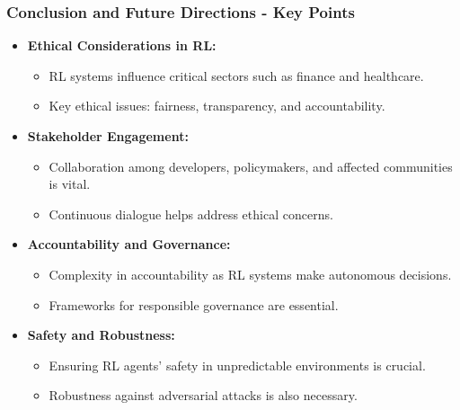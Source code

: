 \documentclass[aspectratio=169]{beamer}
\begin{document}
\begin{frame}[fragile]
    \frametitle{Conclusion and Future Directions - Key Points}
    \begin{itemize}
        \item \textbf{Ethical Considerations in RL:}
            \begin{itemize}
                \item RL systems influence critical sectors such as finance and healthcare.
                \item Key ethical issues: fairness, transparency, and accountability.
            \end{itemize}
        \item \textbf{Stakeholder Engagement:}
            \begin{itemize}
                \item Collaboration among developers, policymakers, and affected communities is vital.
                \item Continuous dialogue helps address ethical concerns.
            \end{itemize}
        \item \textbf{Accountability and Governance:}
            \begin{itemize}
                \item Complexity in accountability as RL systems make autonomous decisions.
                \item Frameworks for responsible governance are essential.
            \end{itemize}
        \item \textbf{Safety and Robustness:}
            \begin{itemize}
                \item Ensuring RL agents' safety in unpredictable environments is crucial.
                \item Robustness against adversarial attacks is also necessary.
            \end{itemize}
    \end{itemize}
\end{frame}
\end{document}
